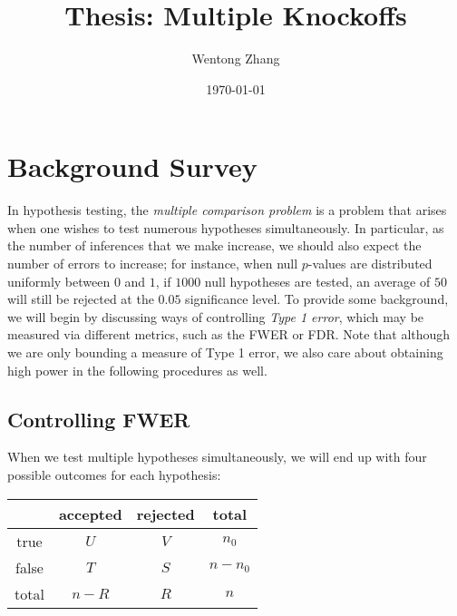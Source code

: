 \documentclass[12pt,reqno]{amsart}
\title{Thesis: Multiple Knockoffs}
\author{Wentong Zhang}
\date{\today}
\numberwithin{equation}{section}
\begin{document}
\maketitle

\tableofcontents

\section{Background Survey}
In hypothesis testing, the \emph{multiple comparison problem} is a problem that arises when one wishes to test numerous hypotheses simultaneously. In particular, as the number of inferences that we make increase, we should also expect the number of errors to increase; for instance, when null $p$-values are distributed uniformly between $0$ and $1$, if $1000$ null hypotheses are tested, an average of $50$ will still be rejected at the $0.05$ significance level. To provide some background, we will begin by discussing ways of controlling \emph{Type 1 error}, which may be measured via different metrics, such as the FWER or FDR. Note that although we are only bounding a measure of Type 1 error, we also care about obtaining high power in the following procedures as well.

\subsection{Controlling FWER}
When we test multiple hypotheses simultaneously, we will end up with four possible outcomes for each hypothesis:
\begin{center}
\begin{tabular}{c|cc|c}
& accepted & rejected & total \\ \hline
true & $U$ & $V$ & $n_0$ \\ 
false & $T$ & $S$ & $n - n_0$ \\ \hline
total & $n - R$ & $R$ & $n$
\end{tabular}
\end{center}
\end{document}
